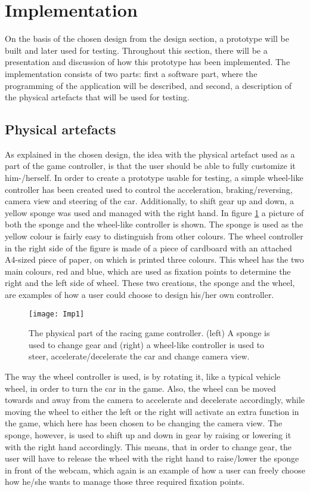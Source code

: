 \section{Implementation}
On the basis of the chosen design from the design section, a prototype will be built and later used for testing.
Throughout this section, there will be a presentation and discussion of how this prototype has been implemented. 
The implementation consists of two parts: first a software part, where the programming of the application will be described, and second, a description of the physical artefacts that will be used for testing.

\subsection{Physical artefacts}
As explained in the chosen design, the idea with the physical artefact used as a part of the game controller, is that the user should be able to fully customize it him-/herself. 
In order to create a prototype usable for testing, a simple wheel-like controller has been created used to control the acceleration, braking/reversing, camera view and steering of the car. 
Additionally, to shift gear up and down, a yellow sponge was used and managed with the right hand. 
In figure \ref{fig:imp1} a picture of both the sponge and the wheel-like controller is shown. 
The sponge is used as the yellow colour is fairly easy to distinguish from other colours. 
The wheel controller in the right side of the figure is made of a piece of cardboard with an attached A4-sized piece of paper, on which is printed three colours. 
This wheel has the two main colours, red and blue, which are used as fixation points to determine the right and the left side of wheel. 
These two creations, the sponge and the wheel, are examples of how a user could choose to design his/her own controller.
\bigskip

\begin{figure}[!htbp]
\centering
\texttt{[image: Imp1]}
\caption{The physical part of the racing game controller. (left) A sponge is used to change gear and (right) a wheel-like controller is used to steer, accelerate/decelerate the car and change camera view.} 
\label{fig:imp1}
\end{figure}

The way the wheel controller is used, is by rotating it, like a typical vehicle wheel, in order to turn the car in the game. 
Also, the wheel can be moved towards and away from the camera to accelerate and decelerate accordingly, while moving the wheel to either the left or the right will activate an extra function in the game, which here has been chosen to be changing the camera view. 
The sponge, however, is used to shift up and down in gear by raising or lowering it with the right hand accordingly. 
This means, that in order to change gear, the user will have to release the wheel with the right hand to raise/lower the sponge in front of the webcam, which again is an example of how a user can freely choose how he/she wants to manage those three required fixation points.

